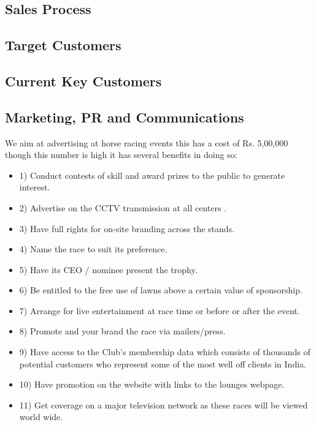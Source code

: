 \documentclass[11pt]{article}
\begin{document}
  \subsection{Sales Process}
  \subsection{Target Customers}
  \subsection{Current Key Customers}
  \subsection{Marketing, PR and Communications}
We aim at advertising at horse racing events this has a cost of Rs. 5,00,000 though this number is high it has several benefits in doing so:
\begin{itemize}
\item 1) Conduct contests of skill and award prizes to the public to generate interest. 
\item 2) Advertise on the CCTV transmission at all centers .
\item 3) Have full rights for on-site branding across the stands.
\item 4) Name the race to suit its preference.
\item 5) Have its CEO / nominee present the trophy.
\item 6) Be entitled to the free use of lawns above a certain value of sponsorship.
\item 7) Arrange for live entertainment at race time or before or after the event.
\item 8) Promote and your brand the race via mailers/press.
\item 9) Have access to the Club's membership data which consists of thousands of potential customers who represent some of the most well off clients in India.
\item 10) Have promotion on the website with links to the lounges webpage.
\item 11) Get coverage on a major television network as these races will be viewed world wide.

\end{itemize}
\end{document}
